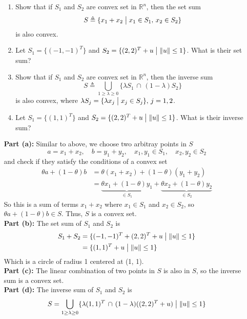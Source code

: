 \documentclass[11pt]{article}
\renewcommand{\norm}[1]{\left\lVert#1\right\rVert}
\begin{document}
\pagebreak

\begin{homeworkProblem}

\begin{enumerate}[label=(\alph*), topsep=0pt, itemsep=2pt]
    \item Show that if $S_1$ and $S_2$ are convex set in $\mathbb{R}^n$, then the set sum
    \[
        S \triangleq \{x_1 + x_2 \bigm\vert x_1 \in S_1, \, x_2 \in S_2\}
    \] is also convex.
    \item Let $S_1 = \{(-1, -1)^T\}$ and $S_2 = \{(2, 2)^T + u \bigm\vert \norm{u} \leq 1\}$. What is their set sum?
    \item Show that if $S_1$ and $S_2$ are convex set in $\mathbb{R}^n$, then the inverse sum
    \[
        S \triangleq \bigcup_{1 \geq \lambda \geq 0} \{\lambda S_1 \, \cap \, (1 - \lambda)S_2\}
    \] is also convex, where $\lambda S_j = \{\lambda x_j \bigm\vert x_j \in S_j\}, \, j = 1, 2$.
    \item Let $S_1 = \{(1, 1)^T\}$ and $S_2 = \{(2, 2)^T + u \bigm\vert \norm{u} \leq 1\}$. What is their inverse sum?
\end{enumerate} \vspace{1\baselineskip}

\solution

\textbf{Part (a):} Similar to above, we choose two arbitray points in $S$
\[  
    a = x_1 + x_2, \quad b = y_1 + y_2, \quad x_1, y_1 \in S_1, \quad x_2, y_2 \in S_2
\]
and check if they satisfy the conditions of a convex set
\begin{align*}
    \theta a + (1 - \theta) b &= \theta (x_1 + x_2) + (1 - \theta)(y_1 + y_2) \\
    &= \underbrace{\theta x_1 + (1 - \theta) y_1}_{\in S_1} + \underbrace{\theta x_2 + (1 - \theta) y_2}_{\in S_2}
\end{align*}
So this is a sum of terms $x_1 + x_2$ where $x_1 \in S_1$ and $x_2 \in S_2$, so $\theta a + (1 - \theta) b \in S$. 
Thus, $S$ is a convex set. \\

\textbf{Part (b):} The set sum of $S_1$ and $S_2$ is
\begin{align*}
    S_1 + S_2 & = \{(-1, -1)^T + (2, 2)^T + u \bigm\vert \norm{u} \leq 1\} \\
    & = \{(1, 1)^T + u \bigm\vert \norm{u} \leq 1\} 
\end{align*}
Which is a circle of radius 1 centered at (1, 1). \\

\textbf{Part (c):} The linear combination of two points in $S$ is also in $S$, so the inverse sum is a convex set. \\
\textbf{Part (d):} The inverse sum of $S_1$ and $S_2$ is
\[
    S = \bigcup_{1 \geq \lambda \geq 0} \{\lambda (1, 1)^T \, \cap \, (1 - \lambda)((2, 2)^T + u) \bigm\vert \norm{u} \leq 1\}
\]

\end{homeworkProblem}
\end{document}

